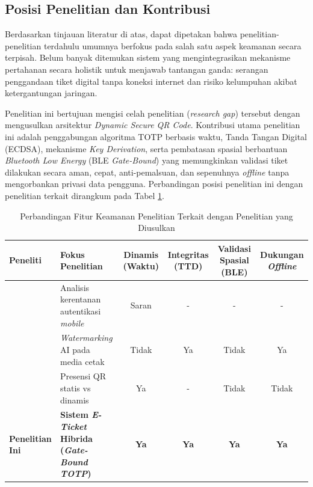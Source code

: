\subsection{Posisi Penelitian dan Kontribusi}
Berdasarkan tinjauan literatur di atas, dapat dipetakan bahwa penelitian-penelitian terdahulu umumnya berfokus pada salah satu aspek keamanan secara terpisah. Belum banyak ditemukan sistem yang mengintegrasikan mekanisme pertahanan secara holistik untuk menjawab tantangan ganda: serangan penggandaan tiket digital tanpa koneksi internet dan risiko kelumpuhan akibat ketergantungan jaringan.

Penelitian ini bertujuan mengisi celah penelitian (\textit{research gap}) tersebut dengan mengusulkan arsitektur \textit{Dynamic Secure QR Code}. Kontribusi utama penelitian ini adalah penggabungan algoritma TOTP berbasis waktu, Tanda Tangan Digital (ECDSA), mekanisme \textit{Key Derivation}, serta pembatasan spasial berbantuan \textit{Bluetooth Low Energy} (BLE \textit{Gate-Bound}) yang memungkinkan validasi tiket dilakukan secara aman, cepat, anti-pemalsuan, dan sepenuhnya \textit{offline} tanpa mengorbankan privasi data pengguna. Perbandingan posisi penelitian ini dengan penelitian terkait dirangkum pada Tabel \ref{tab:state_of_the_art}.

\begin{table}[htbp]
    \caption{Perbandingan Fitur Keamanan Penelitian Terkait dengan Penelitian yang Diusulkan}
    \label{tab:state_of_the_art}
    \centering
    \begin{tabularx}{\textwidth}{ l >{\raggedright\arraybackslash}X c c c c }
        \toprule
        \textbf{Peneliti} & \textbf{Fokus Penelitian} & \textbf{Dinamis (Waktu)} & \textbf{Integritas (TTD)} & \textbf{Validasi Spasial (BLE)} & \textbf{Dukungan \textit{Offline}} \\
        \midrule
        \textcite{sung2015security} & Analisis kerentanan autentikasi \textit{mobile} & Saran & - & - & - \\
        \addlinespace
        \textcite{alsuhibany2025innovative} & \textit{Watermarking} AI pada media cetak & Tidak & Ya & Tidak & Ya \\
        \addlinespace
        \textcite{yanuarafi2023perbandingan} & Presensi QR statis vs dinamis & Ya & - & Tidak & Tidak \\
        \addlinespace
        \textbf{Penelitian Ini} & \textbf{Sistem \textit{E-Ticket} Hibrida (\textit{Gate-Bound TOTP})} & \textbf{Ya} & \textbf{Ya} & \textbf{Ya} & \textbf{Ya} \\
        \bottomrule
    \end{tabularx}
\end{table}